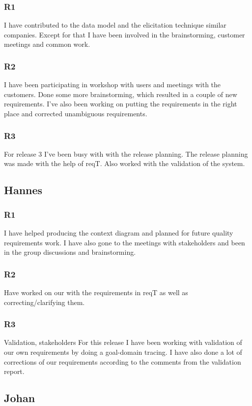 \documentclass[a4paper]{article}
\begin{document}
		\subsubsection{R1}
		I have contributed to the data model and the elicitation technique similar companies. Except for that I have been involved in the brainstorming, customer meetings and common work.
		\subsubsection{R2}
		I have been participating in workshop with users and meetings with the customers. Done some more brainstorming, which resulted in a couple of new requirements. I've also been working on putting the requirements in the right place and corrected unambiguous requirements.
		\subsubsection{R3}
		For release 3 I've been busy with with the release planning. The release planning was made with the help of reqT. Also worked with the validation of the system.
		
	\subsection{Hannes}
		\subsubsection{R1}
		I have helped producing the context diagram and planned for future quality requirements work. I have also gone to the meetings with stakeholders and been in the group discussions and brainstorming.
		\subsubsection{R2}
		Have worked on our with the requirements in reqT as well as correcting/clarifying them.  
		\subsubsection{R3}
		Validation, stakeholders
		For this release I have been working with validation of our own requirements by doing a goal-domain tracing. I have also done a lot of corrections of our requirements according to the comments from the validation report. 
	
	
	\subsection{Johan}
\end{document}
